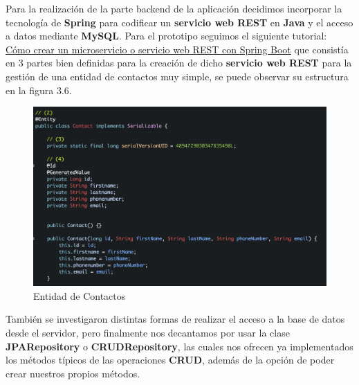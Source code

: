 \begin{flushleft}
    Para la realización de la parte backend de la aplicación decidimos
    incorporar la tecnología de \textbf{Spring} para codificar un \textbf{servicio web REST} en \textbf{Java}
    y el acceso a datos mediante \textbf{MySQL}.
\break
\break
    Para el prototipo seguimos el siguiente tutorial: 
\newline
\href{http://sinbugs.com/como-crear-un-microservicio-o-servicio-web-rest-con-spring-boot-1/}{Cómo crear un microservicio o servicio web REST con Spring Boot}
\break
    que consistía en 3 partes bien definidas para la creación de dicho \textbf{servicio web REST} para la gestión de una entidad de contactos muy simple, se puede observar su estructura
    en la figura 3.6.
    \begin{figure}[H]
        \centering
        \includegraphics[width=6in]{figures/ContactsEntity.png}
        \caption{Entidad de Contactos}
    \end{figure}
\break
\break
    También se investigaron distintas formas de realizar el acceso a la base de datos desde el servidor, pero finalmente nos decantamos por usar la
    clase \textbf{JPARepository} o \textbf{CRUDRepository}, las cuales nos ofrecen ya implementados los métodos típicos de las operaciones \textbf{CRUD}, además de la opción 
    de poder crear nuestros propios métodos.
\end{flushleft}

